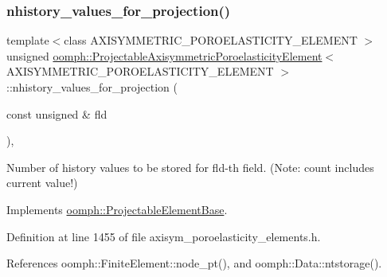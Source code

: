 \subsubsection{\texorpdfstring{nhistory\+\_\+values\+\_\+for\+\_\+projection()}{nhistory\_values\_for\_projection()}}
{\footnotesize\ttfamily template$<$class A\+X\+I\+S\+Y\+M\+M\+E\+T\+R\+I\+C\+\_\+\+P\+O\+R\+O\+E\+L\+A\+S\+T\+I\+C\+I\+T\+Y\+\_\+\+E\+L\+E\+M\+E\+NT $>$ \\
unsigned \hyperlink{classoomph_1_1ProjectableAxisymmetricPoroelasticityElement}{oomph\+::\+Projectable\+Axisymmetric\+Poroelasticity\+Element}$<$ A\+X\+I\+S\+Y\+M\+M\+E\+T\+R\+I\+C\+\_\+\+P\+O\+R\+O\+E\+L\+A\+S\+T\+I\+C\+I\+T\+Y\+\_\+\+E\+L\+E\+M\+E\+NT $>$\+::nhistory\+\_\+values\+\_\+for\+\_\+projection (\begin{DoxyParamCaption}\item[{const unsigned \&}]{fld }\end{DoxyParamCaption})\hspace{0.3cm}{\ttfamily [inline]}, {\ttfamily [virtual]}}



Number of history values to be stored for fld-\/th field. (Note\+: count includes current value!) 



Implements \hyperlink{classoomph_1_1ProjectableElementBase_ac6790f394630b964663281f8740f43a5}{oomph\+::\+Projectable\+Element\+Base}.



Definition at line 1455 of file axisym\+\_\+poroelasticity\+\_\+elements.\+h.



References oomph\+::\+Finite\+Element\+::node\+\_\+pt(), and oomph\+::\+Data\+::ntstorage().

\mbox{\label{classoomph_1_1ProjectableAxisymmetricPoroelasticityElement_a8082f4f9da812ae6965e20838ecce8d2}} 
